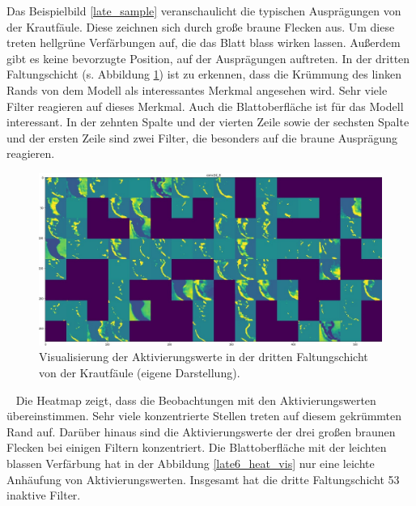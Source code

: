 Das Beispielbild \ref{late_sample} veranschaulicht die typischen Ausprägungen von der Krautfäule. Diese zeichnen sich durch große braune Flecken aus. Um diese treten hellgrüne Verfärbungen auf, die das Blatt blass wirken lassen. Außerdem gibt es keine bevorzugte Position, auf der Ausprägungen auftreten. In der dritten Faltungschicht (s. Abbildung \ref{late6_act_vis}) ist zu erkennen, dass die Krümmung des linken Rands von dem Modell als interessantes Merkmal angesehen wird. Sehr viele Filter reagieren auf dieses Merkmal. Auch die Blattoberfläche ist für das Modell interessant. In der zehnten Spalte und der vierten Zeile sowie der sechsten Spalte und der ersten Zeile sind zwei Filter, die besonders auf die braune Ausprägung reagieren.


\begin{figure}[h!]
	\centering
	\includegraphics[width=\textwidth]{visualisierungen/late/activation/late_sample6.JPG}
	\caption{Visualisierung der Aktivierungswerte in der dritten Faltungschicht von der Krautfäule (eigene Darstellung).}
	\label{late6_act_vis}
\end{figure}
~\newline
Die Heatmap zeigt, dass die Beobachtungen mit den Aktivierungswerten übereinstimmen. Sehr viele konzentrierte Stellen treten auf diesem gekrümmten Rand auf. Darüber hinaus sind die Aktivierungswerte der drei großen braunen Flecken bei einigen Filtern konzentriert. Die Blattoberfläche mit der leichten blassen Verfärbung hat in der Abbildung \ref{late6_heat_vis} nur eine leichte Anhäufung von Aktivierungswerten. Insgesamt hat die dritte Faltungschicht 53 inaktive Filter.

